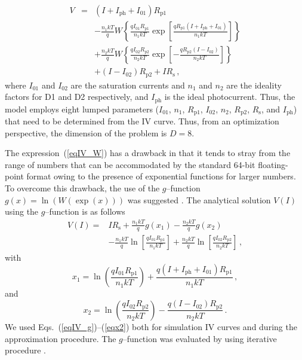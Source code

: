 \documentclass[a4paper,fleqn]{cas-dc}
\begin{document}
\begin{eqnarray}
\label{eqIV_W}
V&=& (I+I_\mathrm{ph}+I_{01})R_\mathrm{p1} \nonumber \\
  &&-\frac{n_1kT}{q}W\left\{\frac{qI_{01}R_\mathrm{p1}}{n_1kT}\exp\left[\frac{qR_\mathrm{p1}(I+I_\mathrm{ph}+I_{01})}{n_1kT}\right]\right\} \nonumber \\
  &&+\frac{n_2kT}{q}W\left\{\frac{qI_{02}R_\mathrm{p2}}{n_2kT}\exp\left[-\frac{qR_\mathrm{p2}(I-I_{02})}{n_2kT}\right]\right\} \nonumber \\
  &&+(I-I_{02})R_\mathrm{p2}+IR_\mathrm{s}\,,
\end{eqnarray}
where
$I_{01}$ and $I_{02}$ are the saturation currents and
$n_1$ and $n_2$ are
the ideality factors for D1 and D2 respectively,
and $I_\mathrm{ph}$ is the ideal photocurrent.
Thus, the model employs eight lumped parameters
($I_{01}$, $n_1$, $R_\mathrm{p1}$, $I_{02}$, $n_2$, $R_\mathrm{p2}$,
$R_\mathrm{s}$, and $I_\mathrm{ph}$)
that need to be determined from the IV curve.
Thus, from an optimization perspective, the dimension of the problem is $D=8$.

The expression~(\ref{eqIV_W}) has a drawback in that it tends to stray from the range of numbers that can be accommodated by the standard 64-bit floating-point format owing to the presence of exponential functions for larger numbers.
To overcome this drawback, the use of the $g$--function $g(x)=\ln(W(\exp(x)))$ was suggested \cite{roberts2015calculating}.
The analytical solution $V(I)$ using the $g$--function is as follows \cite{roberts2015calculating}
\begin{equation}
\label{eqIV_g}
\begin{split}
V(I)= &IR_\mathrm{s}+\frac{n_1kT}{q}g(x_1)-\frac{n_2kT}{q}g(x_2) \\
  &-\frac{n_1kT}{q}\ln\left[\frac{qI_{01}R_\mathrm{p1}}{n_1kT}\right] +\frac{n_2kT}{q}\ln\left[\frac{qI_{02}R_\mathrm{p2}}{n_2kT}\right]\,,
\end{split}
\end{equation}
with
\begin{equation}
\label{eqx1}
x_1= \ln\left(\frac{qI_{01}R_\mathrm{p1}}{n_1kT}\right)+\frac{q(I+I_\mathrm{ph}+I_{01})R_\mathrm{p1}}{n_1kT}\,,
\end{equation}
and
\begin{equation}
\label{eqx2}
x_2= \ln\left(\frac{qI_{02}R_\mathrm{p2}}{n_2kT}\right)-\frac{q(I-I_{02})R_\mathrm{p2}}{n_2kT}\,.
\end{equation}
We used Eqs.~(\ref{eqIV_g})--(\ref{eqx2}) both for simulation IV curves and during the approximation procedure.
The $g$--function was evaluated by using iterative procedure \cite{roberts2015calculating}.
\end{document}
